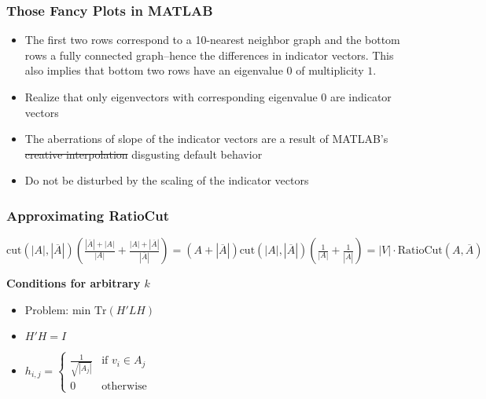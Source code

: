 \documentclass{article}
\begin{document}
{        \subsubsection{Those Fancy Plots in MATLAB}
            \begin{itemize}
                \item The first two rows correspond to a 10-nearest neighbor
graph and the bottom rows a fully connected graph--hence the differences in
indicator vectors. This also implies that bottom two rows have an eigenvalue
\ensuremath{0} of multiplicity \ensuremath{1}.
                \item Realize that only eigenvectors with corresponding
eigenvalue \ensuremath{0} are indicator vectors
                \item The aberrations of slope of the indicator vectors are a
result of MATLAB's \sout{creative interpolation} disgusting default behavior
                \item Do not be disturbed by the scaling of the indicator vectors
            \end{itemize}

        \subsubsection{Approximating RatioCut}
            \begin{math}\text{cut}(|A|,|\overline{A}|)\left(\frac{|\overline{A}|+|A|}
{|A|}+\frac{|A|+|\overline{A}|}{|\overline{A}|}\right)=\left(A+|\overline{A}|\right)
\text{cut}(|A|,|\overline{A}|)\left(\frac{1}{|A|}+\frac{1}{|\overline{A}|}\right)
=|V|\cdot \text{RatioCut}(A, \overline{A}) 
            \end{math}

            \textbf{Conditions for arbitrary \ensuremath{k}} 
            \begin{itemize}
                \item Problem: min \ensuremath{\text{Tr}(H'LH)}
                \item \ensuremath{H'H = I}
                \item \begin{math}
                    h_{i,j}= \left\{
                    \begin{array}{lr}
                        \frac{1}{\sqrt{|A_j|}}&\text{if } v_i \in A_j\\
                        0&\text{otherwise}
                    \end{array}\right.
            \end{math}
            \end{itemize}
}
\end{document}
